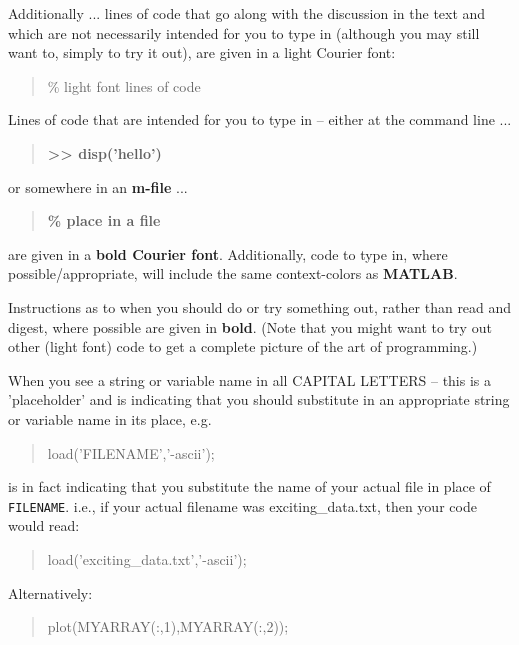 \documentclass{tufte-book} %
\newenvironment{docspec}{\begin{quotation}\ttfamily\parskip0pt\parindent0pt\ignorespaces}{\end{quotation}}
\newenvironment{docspecbold}{\begin{quotation}\ttfamily\bfseries\parskip0pt\parindent0pt\ignorespaces}{\end{quotation}}
\begin{document}
\noindent Additionally ... lines of code that go along with the discussion in the text and which are not necessarily intended for you to type in (although you may still want to, simply to try it out), are given in a light Courier font:

\begin{docspec}
\% light font lines of code
\end{docspec} 

Lines of code that are intended for you to type in -- either at the command line ...

\begin{docspecbold}
>> disp(\textcolor[rgb]{1,0,1}{'hello'})
\end{docspecbold}

\noindent or somewhere in an \textbf{m-file} ...

\begin{docspecbold}
\textcolor[rgb]{0,0.501961,0}{\% place in a file}
\end{docspecbold} 

\noindent are given in a \textbf{bold Courier font}. Additionally, code to type in, where possible/appropriate, will include the same context-colors as \textbf{MATLAB}.

Instructions as to when you should do or try something out, rather than read and digest, where possible are given in \textbf{bold}. (Note that you might want to try out other (light font) code to get a complete picture of the art of programming.)

\vspace{2mm}

When you see a string or variable name in all CAPITAL LETTERS -- this is a 'placeholder' and is indicating that you should substitute in an appropriate string or variable name in its place, e.g. 

\begin{docspec}
load('FILENAME','-ascii');
\end{docspec}  

\noindent is in fact indicating that you substitute the name of your actual file in place of \texttt{FILENAME}. i.e., if your actual filename was \textsf{exciting\_data.txt}, then your code would read:

\begin{docspec}
load('exciting\_data.txt','-ascii');
\end{docspec}  

Alternatively:

\begin{docspec}
plot(MYARRAY(:,1),MYARRAY(:,2));
\end{docspec}
\end{document}
